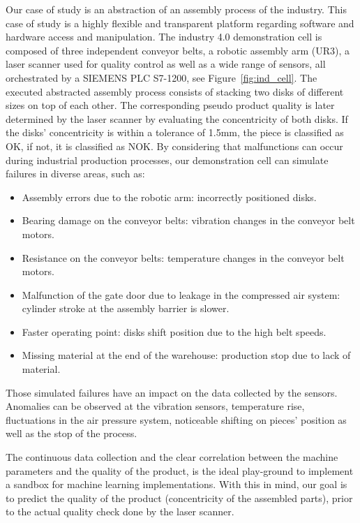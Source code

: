 \documentclass[5p,times,procedia]{elsarticle}
\begin{document}
Our case of study is an abstraction of an assembly process of the industry. This case of study is a highly flexible and transparent platform regarding software and hardware access and manipulation. The industry 4.0 demonstration cell is composed of three independent conveyor belts, a robotic assembly arm (UR3), a laser scanner used for quality control as well as a wide range of sensors, all orchestrated by a SIEMENS PLC S7-1200, see Figure~\ref{fig:ind_cell}. 
The executed abstracted assembly process consists of stacking two disks of different sizes on top of each other. The corresponding pseudo product quality is later determined by the laser scanner by evaluating the concentricity of both disks. If the disks' concentricity is within a tolerance of 1.5mm, the piece is classified as OK, if not, it is classified as NOK.
By considering that malfunctions can occur during industrial production processes, our demonstration cell can simulate failures in diverse areas, such as:

\begin{itemize}
       \item Assembly errors due to the robotic arm: incorrectly positioned disks.
       \item Bearing damage on the conveyor belts: vibration changes in the conveyor belt motors.
       \item Resistance on the conveyor belts: temperature changes in the conveyor belt motors.
       \item Malfunction of the gate door due to leakage in the compressed air system: cylinder stroke at the assembly barrier is slower.
       \item Faster operating point: disks shift position due to the high belt speeds.
       \item Missing material at the end of the warehouse: production stop due to lack of material.
\end{itemize}

Those simulated failures have an impact on the data collected by the sensors. Anomalies can be observed at the vibration sensors, temperature rise, fluctuations in the air pressure system, noticeable shifting on pieces' position as well as the stop of the process.

The continuous data collection and the clear correlation between the machine parameters and the quality of the product, is the ideal play-ground to implement a sandbox for machine learning implementations. With this in mind, our goal is to predict the quality of the product (concentricity of the assembled parts), prior to the actual quality check done by the laser scanner. 
\end{document}
